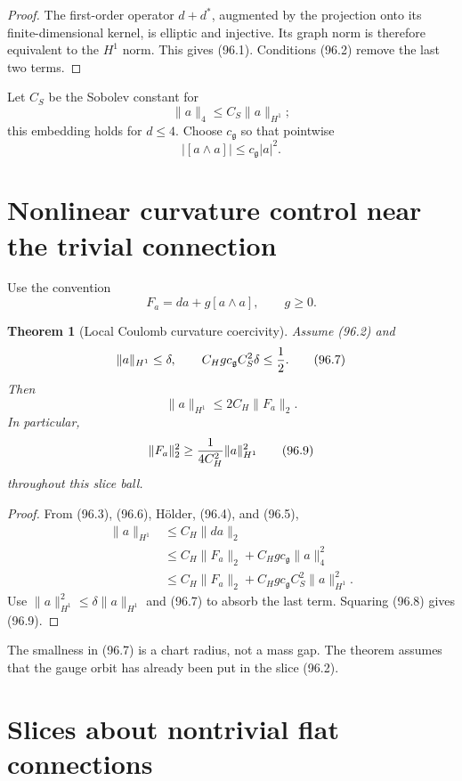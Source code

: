 \documentclass[11pt]{article}
\newtheorem{theorem}{Theorem}[section]
\theoremstyle{remark}
\begin{document}
\begin{proof}
The first-order operator \(d+d^*\), augmented by the projection
onto its finite-dimensional kernel, is elliptic and injective.
Its graph norm is therefore equivalent to the \(H^1\) norm.  This
gives (96.1).  Conditions (96.2) remove the last two terms.
\end{proof}

Let \(C_S\) be the Sobolev constant for
\[
 \|a\|_4\leq C_S\|a\|_{H^1};                          \tag{96.4}
\]
this embedding holds for \(d\leq4\).  Choose \(c_{\mathfrak g}\)
so that pointwise
\[
 |[a\wedge a]|\leq c_{\mathfrak g}|a|^2.              \tag{96.5}
\]

\section{Nonlinear curvature control near the trivial connection}

Use the convention
\[
 F_a=da+g[a\wedge a],\qquad g\geq0.                   \tag{96.6}
\]

\begin{theorem}[Local Coulomb curvature coercivity]
\label{thm:v15v96-local}
Assume (96.2) and
\[
 \|a\|_{H^1}\leq\delta,\qquad
 C_Hg c_{\mathfrak g}C_S^2\delta\leq{1\over2}.        \tag{96.7}
\]
Then
\[
 \|a\|_{H^1}\leq2C_H\|F_a\|_2.                       \tag{96.8}
\]
In particular,
\[
 \|F_a\|_2^2\geq{1\over4C_H^2}\|a\|_{H^1}^2          \tag{96.9}
\]
throughout this slice ball.
\end{theorem}

\begin{proof}
From (96.3), (96.6), Hölder, (96.4), and (96.5),
\[
\begin{split}
 \|a\|_{H^1}
 &\leq C_H\|da\|_2\\
 &\leq C_H\|F_a\|_2+
 C_Hg c_{\mathfrak g}\|a\|_4^2\\
 &\leq C_H\|F_a\|_2+
 C_Hg c_{\mathfrak g}C_S^2\|a\|_{H^1}^2.             \tag{96.10}
\end{split}
\]
Use \(\|a\|_{H^1}^2\leq\delta\|a\|_{H^1}\) and (96.7) to absorb
the last term.  Squaring (96.8) gives (96.9).
\end{proof}

The smallness in (96.7) is a chart radius, not a mass gap.  The
theorem assumes that the gauge orbit has already been put in the
slice (96.2).

\section{Slices about nontrivial flat connections}
\end{document}

